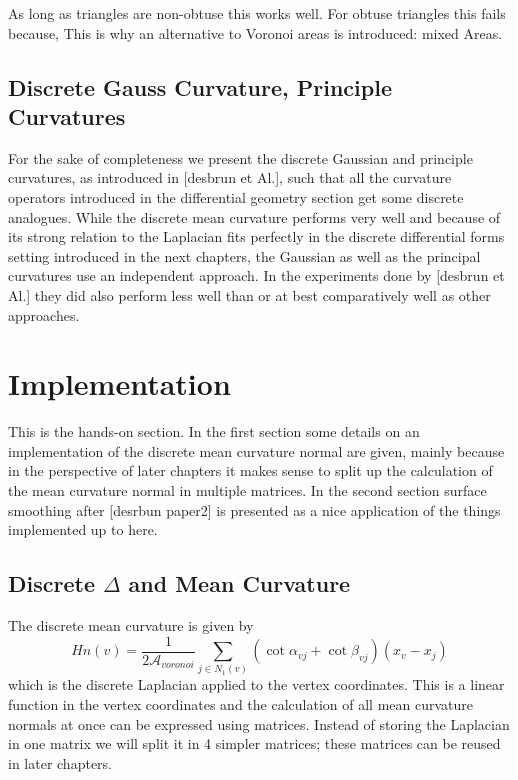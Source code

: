 
As long as triangles are non-obtuse this works well. For obtuse triangles this fails because,  This is why an alternative to Voronoi areas is introduced: mixed Areas.



\subsection{Discrete Gauss Curvature, Principle Curvatures}
For the sake of completeness we present the discrete Gaussian and principle curvatures, as introduced in [desbrun et Al.], such that all the curvature operators introduced in the differential geometry section get some discrete analogues. While the discrete mean curvature performs very well and because of its strong relation to the Laplacian fits perfectly in the discrete differential forms setting introduced in the next chapters, the Gaussian as well as the principal curvatures use an independent approach. In the experiments done by [desbrun et Al.] they did also perform less well than or at best comparatively well as other approaches. 


\section{Implementation}
This is the hands-on section. In the first section some details on an implementation of the discrete mean curvature normal are given, mainly because in the perspective of later chapters it makes sense to split up the calculation of the mean curvature normal in multiple matrices. In the second section surface smoothing after [desrbun paper2] is presented as a nice application of the things implemented up to here.

\subsection{Discrete $\Delta$ and Mean Curvature}
The discrete mean curvature is given by
\[Hn (v) = \frac{1}{2\mathcal A_{voronoi}}\sum_{j\in N_1(v)} (\cot \alpha_{vj} + \cot \beta_{vj})(x_v-x_j)\] 
which is the discrete Laplacian   applied to the vertex coordinates. This is a linear function in the vertex coordinates and the calculation of all mean curvature normals at once can be expressed using matrices. Instead of storing the Laplacian in one matrix we will split it in 4 simpler matrices; these matrices can be reused in later chapters.

